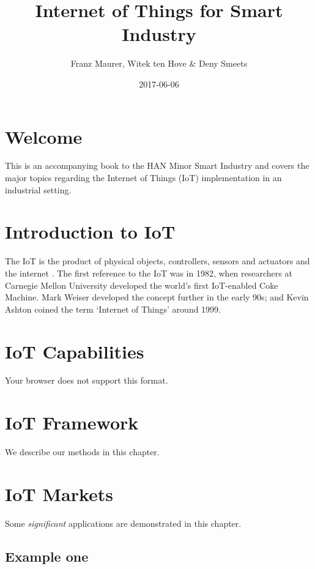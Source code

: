 \documentclass[]{book}
\title{Internet of Things for Smart Industry}
\author{Franz Maurer, Witek ten Hove \& Deny Smeets}
\date{2017-06-06}
\theoremstyle{definition}
\theoremstyle{definition}
\theoremstyle{remark}
\begin{document}
\maketitle

{
\setcounter{tocdepth}{1}
\tableofcontents
}
\chapter{Welcome}\label{welcome}

This is an accompanying book to the HAN Minor Smart Industry and covers
the major topics regarding the Internet of Things (IoT) implementation
in an industrial setting.

\chapter{Introduction to IoT}\label{intro}

The IoT is the product of physical objects, controllers, sensors and
actuators and the internet \citep{mcewen_designing_2013}. The first
reference to the IoT was in 1982, when researchers at Carnegie Mellon
University developed the world's first IoT-enabled Coke Machine. Mark
Weiser developed the concept further in the early 90s; and Kevin Ashton
coined the term `Internet of Things' around 1999.

\chapter{IoT Capabilities}\label{capabilities}

 Your browser does not support this format.

\chapter{IoT Framework}\label{framework}

We describe our methods in this chapter.

\chapter{IoT Markets}\label{markets}

Some \emph{significant} applications are demonstrated in this chapter.

\section{Example one}\label{example-one}
\end{document}
